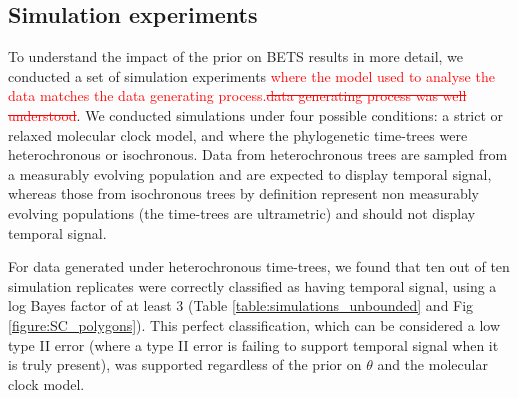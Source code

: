 \documentclass[10pt,letterpaper]{article}
\begin{document}
\subsection*{Simulation experiments}
To understand the impact of the prior on BETS results in more detail, we conducted a set of simulation experiments \textcolor{red}{where the model used to analyse the data matches the data generating process.}\textcolor{red}{\sout{data generating process was well understood}}. We conducted simulations under four possible conditions: a strict or relaxed molecular clock model, and where the phylogenetic time-trees were heterochronous or isochronous. Data from heterochronous trees are sampled from a measurably evolving population and are expected to display temporal signal, whereas those from isochronous trees by definition represent non measurably evolving populations (the time-trees are ultrametric) and should not display temporal signal. 

For data generated under heterochronous time-trees, we found that ten out of ten simulation replicates were correctly classified as having temporal signal, using a log Bayes factor of at least 3 (Table \ref{table:simulations_unbounded} and Fig \ref{figure:SC_polygons}). This perfect classification, which can be considered a low type II error (where a type II error is failing to support temporal signal when it is truly present), was supported regardless of the prior on $\theta$ and the molecular clock model. 
\end{document}
